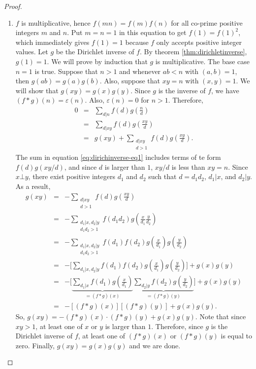 \documentclass[12pt]{subfile}
\begin{document}
\begin{proof}
\begin{enumerate}
				\item $f$ is multiplicative, hence $f(mn)=f(m)f(n)$ for all co-prime positive integers $m$ and $n$. Put $m=n=1$ in this equation to get $f(1)=f(1)^2$, which immediately gives $f(1)=1$ because $f$ only accepts positive integer values. Let $g$ be the Dirichlet inverse of $f$. By theorem \eqref{thm:dirichletinverse}, $g(1)=1$. We will prove by induction that $g$ is multiplicative. The base case $n=1$ is true. Suppose that $n>1$ and whenever $ab<n$ with $(a,b)=1$, then $g(ab)=g(a)g(b)$. Also, suppose that $xy=n$ with $(x,y)=1$. We will show that $g(xy)=g(x)g(y)$. Since $g$ is the inverse of $f$, we have $(f \ast g)(n) = \varepsilon(n)$. Also, $\varepsilon(n)=0$ for $n>1$. Therefore,
					\begin{eqnarray}
						0 &=& \sum_{d|n} f(d) g\left(\frac{n}{d}\right)\nonumber\\
						  &=& \sum_{d|xy} f(d) g\left(\frac{xy}{d}\right) \nonumber\\
						  &=& g(xy) + \sum\limits_{\substack{d|xy \\ d>1}} f(d) g\left(\frac{xy}{d}\right).\label{eq:dirichinverse-eq1}
					\end{eqnarray}
				The sum in equation \eqref{eq:dirichinverse-eq1} includes terms of te form $f(d)g(xy/d)$, and since $d$ is larger than $1$, $xy/d$ is less than $xy=n$. Since $x \bot y$, there exist positive integers $d_1$ and $d_2$ such that $d=d_1d_2$, $d_1|x$, and $d_2|y$. As a result,
					\begin{eqnarray*}
						g(xy) &=& - \sum\limits_{\substack{d|xy \\ d>1}} f(d) g\left(\frac{xy}{d}\right)\\
							  &=& - \sum\limits_{\substack{d_1|x, d_2|y \\ d_1d_2>1}} f(d_1d_2) g\left(\frac{x}{d_1} \frac{y}{d_2}\right)\\
							  &=& - \sum\limits_{\substack{d_1|x, d_2|y \\ d_1d_2>1}} f(d_1)f(d_2) g\left(\frac{x}{d_1}\right) g\left(\frac{y}{d_2}\right)\\
							  &=& - \bigg[\sum\limits_{d_1|x, d_2|y} f(d_1)f(d_2) g\left(\frac{x}{d_1}\right) g\left(\frac{y}{d_2}\right)\bigg] + g(x)g(y)\\
							  &=& - \bigg[\underbrace{\sum\limits_{d_1|x} f(d_1) g\left(\frac{x}{d_1}\right)}_{=(f \ast g)(x)} \underbrace{\sum\limits_{d_2|y} f(d_2) g\left(\frac{y}{d_2}\right)}_{=(f \ast g)(y)} \bigg] + g(x)g(y)\\
							  &=& -\left[(f \ast g)(x)\right] \left[(f\ast g)(y)\right] + g(x)g(y).
					\end{eqnarray*}
				So, $g(xy)= -(f \ast g)(x) \cdot (f\ast g)(y) + g(x)g(y)$. Note that since $xy>1$, at least one of $x$ or $y$ is larger than $1$. Therefore, since $g$ is the Dirichlet inverse of $f$, at least one of $(f \ast g)(x)$ or $(f \ast g)(y)$ is equal to zero. Finally, $g(xy)=g(x)g(y)$ and we are done.
				

\end{enumerate}
\end{proof}
\end{document}
